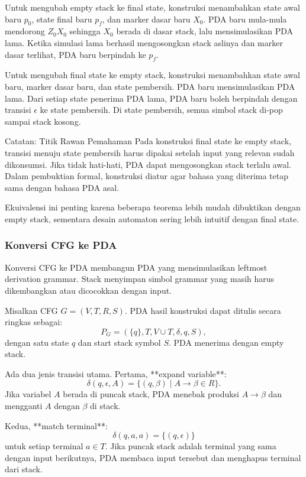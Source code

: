 Untuk mengubah empty stack ke final state, konstruksi menambahkan state awal baru $p_0$, state final baru $p_f$, dan marker dasar baru $X_0$. PDA baru mula-mula mendorong $Z_0X_0$ sehingga $X_0$ berada di dasar stack, lalu mensimulasikan PDA lama. Ketika simulasi lama berhasil mengosongkan stack aslinya dan marker dasar terlihat, PDA baru berpindah ke $p_f$.

Untuk mengubah final state ke empty stack, konstruksi menambahkan state awal baru, marker dasar baru, dan state pembersih. PDA baru mensimulasikan PDA lama. Dari setiap state penerima PDA lama, PDA baru boleh berpindah dengan transisi $\epsilon$ ke state pembersih. Di state pembersih, semua simbol stack di-pop sampai stack kosong.

\begin{cmt}{Catatan: Titik Rawan Pemahaman}{}
Pada konstruksi final state ke empty stack, transisi menuju state pembersih harus dipakai setelah input yang relevan sudah dikonsumsi. Jika tidak hati-hati, PDA dapat mengosongkan stack terlalu awal. Dalam pembuktian formal, konstruksi diatur agar bahasa yang diterima tetap sama dengan bahasa PDA asal.
\end{cmt}

Ekuivalensi ini penting karena beberapa teorema lebih mudah dibuktikan dengan empty stack, sementara desain automaton sering lebih intuitif dengan final state.

\subsubsection{Konversi CFG ke PDA}

\begin{jawab}
Konversi CFG ke PDA membangun PDA yang mensimulasikan leftmost derivation grammar. Stack menyimpan simbol grammar yang masih harus dikembangkan atau dicocokkan dengan input.
\end{jawab}

Misalkan CFG $G=(V,T,R,S)$. PDA hasil konstruksi dapat ditulis secara ringkas sebagai:
\[
    P_G=(\{q\},T,V\cup T,\delta,q,S),
\]
dengan satu state $q$ dan start stack symbol $S$. PDA menerima dengan empty stack.

Ada dua jenis transisi utama. Pertama, **expand variable**:
\[
    \delta(q,\epsilon,A)=\{(q,\beta)\mid A\rightarrow \beta \in R\}.
\]
Jika variabel $A$ berada di puncak stack, PDA menebak produksi $A\rightarrow\beta$ dan mengganti $A$ dengan $\beta$ di stack.

Kedua, **match terminal**:
\[
    \delta(q,a,a)=\{(q,\epsilon)\}
\]
untuk setiap terminal $a\in T$. Jika puncak stack adalah terminal yang sama dengan input berikutnya, PDA membaca input tersebut dan menghapus terminal dari stack.


